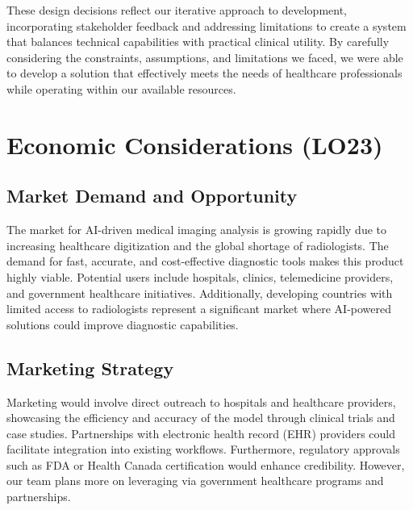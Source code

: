 \documentclass{article}
\begin{document}
\noindent These design decisions reflect our iterative approach to development, incorporating stakeholder feedback and addressing limitations to create a system that balances technical capabilities with practical clinical utility. By carefully considering the constraints, assumptions, and limitations we faced, we were able to develop a solution that effectively meets the needs of healthcare professionals while operating within our available resources.

\section{Economic Considerations (LO23)}


\subsection{Market Demand and Opportunity}
The market for AI-driven medical imaging analysis is growing rapidly due to increasing healthcare digitization and the global shortage of radiologists. The demand for fast, accurate, and cost-effective diagnostic tools makes this product highly viable. Potential users include hospitals, clinics, telemedicine providers, and government healthcare initiatives. Additionally, developing countries with limited access to radiologists represent a significant market where AI-powered solutions could improve diagnostic capabilities.

\subsection{Marketing Strategy}
Marketing would involve direct outreach to hospitals and healthcare providers, showcasing the efficiency and accuracy of the model through clinical trials and case studies. Partnerships with electronic health record (EHR) providers could facilitate integration into existing workflows. Furthermore, regulatory approvals such as FDA or Health Canada certification would enhance credibility. However, our team plans more on leveraging via government healthcare programs and partnerships.
\end{document}
